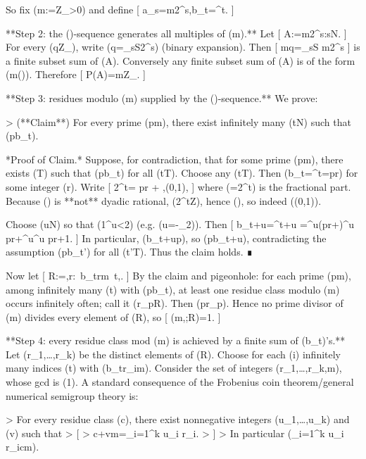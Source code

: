 So fix (m:=\alpha\in\mathbb Z_{>0}) and define
[
a_s=m2^s,\qquad b_t=^t\beta\rfloor.
]

**Step 2: the (\alpha)-sequence generates all multiples of (m).**
Let
[
A:={m2^s:s\in\mathbb N}.
]
For every (q\in\mathbb Z_{}), write (q=\sum_{s\in S}2^s) (binary expansion). Then
[
mq=\sum_{s\in S} m2^s
]
is a finite subset sum of (A). Conversely any finite subset sum of (A) is of the form (m\cdot()). Therefore
[
P(A)=m\mathbb Z_{}.
]

**Step 3: residues modulo (m) supplied by the (\beta)-sequence.**
We prove:

> (**Claim**) For every prime (p\mid m), there exist infinitely many (t\in\mathbb N) such that (p\nmid b_t).

*Proof of Claim.* Suppose, for contradiction, that for some prime (p\mid m), there exists (T) such that (p\mid b_t) for all (t\ge T). Choose any (t\ge T). Then (b_t=^t\beta\rfloor=pr) for some integer (r). Write
[
2^t\beta = pr + \varepsilon,\qquad \varepsilon\in(0,1),
]
where (\varepsilon={2^t\beta}) is the fractional part. Because (\beta) is **not** dyadic rational, (2^t\beta\notin\mathbb Z), hence (\varepsilon{}), so indeed (\varepsilon\in(0,1)).

Choose (u\in\mathbb N) so that (1^u\varepsilon <2) (e.g. (u=\lceil -\log_2\varepsilon\rceil)). Then
[
b_{t+u}=\left{}^{t+u}\beta\right\rfloor
=\left{}^u(pr+\varepsilon)\right{}^u pr+^u\varepsilon{}^u pr+1.
]
In particular, (b_{t+u}\pmod p), so (p\nmid b_{t+u}), contradicting the assumption (p\mid b_{t'}) for all (t'\ge T). Thus the claim holds. ∎

Now let
[
R:={,r:\ b_t\equiv r\pmod m\ t,}.
]
By the claim and pigeonhole: for each prime (p\mid m), among infinitely many (t) with (p\nmid b_t), at least one residue class modulo (m) occurs infinitely often; call it (r_p\in R). Then (p\nmid r_p). Hence no prime divisor of (m) divides every element of (R), so
[
\gcd(m,;R)=1.
]

**Step 4: every residue class mod (m) is achieved by a finite sum of (b_t)’s.**
Let (r_1,\dots,r_k) be the distinct elements of (R). Choose for each (i) infinitely many indices (t) with (b_t\equiv r_i\pmod m). Consider the set of integers ({r_1,\dots,r_k,m}), whose gcd is (1). A standard consequence of the Frobenius coin theorem/general numerical semigroup theory is:

> For every residue class (c), there exist nonnegative integers (u_1,\dots,u_k) and (v) such that
> [
> c+vm=\sum_{i=1}^k u_i r_i.
> ]
> In particular (\sum_{i=1}^k u_i r_i\equiv c\pmod m).

